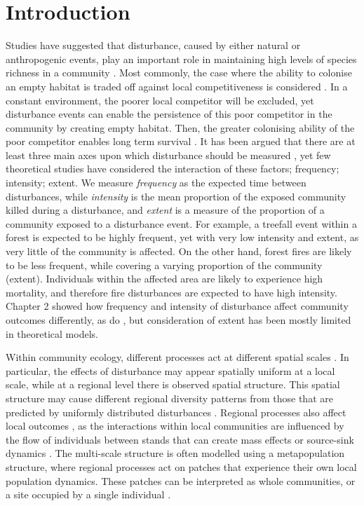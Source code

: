 \section{Introduction}
Studies have suggested that disturbance, caused by either natural or anthropogenic events, play an important role in maintaining high levels of species richness in a community \citep{connell1978diversity,huston1979general,sousa1984role,schoener1974resource}. Most commonly, the case where the ability to colonise an empty habitat is traded off against local competitiveness is considered \citep[e.g.][]{tilman1994competition, cadotte2006testing}. In a constant environment, the poorer local competitor will be excluded, yet disturbance events can enable the persistence of this poor competitor in the community by creating empty habitat. Then, the greater colonising ability of the poor competitor enables long term survival \citep{sousa1984role,denslow1987tropical,connell1978diversity,grime1973competitive,huston1979general}. It has been argued that there are at least three main axes upon which disturbance should be measured \citep{malanson1984intensity,miller1982community,sousa1984role}, yet few theoretical studies have considered the interaction of these factors; frequency; intensity; extent. We measure \emph{frequency} as the expected time between disturbances, while \emph{intensity} is the mean proportion of the exposed community killed during a disturbance, and \emph{extent} is a measure of the proportion of a community exposed to a disturbance event. For example, a treefall event within a forest is expected to be highly frequent, yet with very low intensity and extent, as very little of the community is affected. On the other hand, forest fires are likely to be less frequent, while covering a varying proportion of the community (extent). Individuals within the affected area are likely to experience high mortality, and therefore fire disturbances are expected to have high intensity. Chapter 2 showed how  frequency and intensity of disturbance affect community outcomes differently, as do \cite{miller2011frequency}, but consideration of extent has been mostly limited in theoretical models.

Within community ecology, different processes act at different spatial scales \citep{levin1992problem}. In particular, the effects of disturbance may appear spatially uniform at a local scale, while at a regional level there is observed spatial structure. This spatial structure may cause different regional diversity patterns from those that are predicted by uniformly distributed disturbances \citep{vuilleumier2007patch}. Regional processes also affect local outcomes \citep{holt1993ecology}, as the interactions within local communities are influenced by the flow of individuals between stands that can create mass effects \citep{shmida1985biological} or source-sink dynamics \citep{pulliam1988sources}. The multi-scale structure is often modelled using a metapopulation structure, where regional processes act on patches that experience their own local population dynamics. These patches can be interpreted as whole communities, or a site occupied by a single individual \citep{tilman1994competition,calcagno2006coexistence}.

